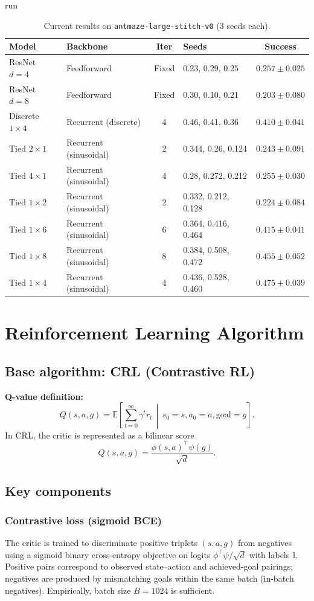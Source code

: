 run\documentclass[11pt]{article}
\begin{document}
\begin{table}[b]
\centering
\small
\begin{tabular}{l l c l c}
\hline
\textbf{Model} & \textbf{Backbone} & \textbf{Iter} & \textbf{Seeds} & \textbf{Success} \\
\hline
ResNet $d=4$ & Feedforward & Fixed & 0.23, 0.29, 0.25 & $0.257 \pm 0.025$ \\
ResNet $d=8$ & Feedforward & Fixed & 0.30, 0.10, 0.21 & $0.203 \pm 0.080$ \\
Discrete $1\times4$ & Recurrent (discrete) & 4 & 0.46, 0.41, 0.36 & $0.410 \pm 0.041$ \\
Tied $2\times1$ & Recurrent (sinusoidal) & 2 & 0.344, 0.26, 0.124 & $0.243 \pm 0.091$ \\
Tied $4\times1$ & Recurrent (sinusoidal) & 4 & 0.28, 0.272, 0.212 & $0.255 \pm 0.030$ \\
Tied $1\times2$ & Recurrent (sinusoidal) & 2 & 0.332, 0.212, 0.128 & $0.224 \pm 0.084$ \\
Tied $1\times6$ & Recurrent (sinusoidal) & 6 & 0.364, 0.416, 0.464 & $0.415 \pm 0.041$ \\
Tied $1\times8$ & Recurrent (sinusoidal) & 8 & 0.384, 0.508, 0.472 & $0.455 \pm 0.052$ \\
Tied $1\times4$ & Recurrent (sinusoidal) & 4 & 0.436, 0.528, 0.460 & $0.475 \pm 0.039$ \\
\hline
\end{tabular}
\caption{Current results on \texttt{antmaze-large-stitch-v0} (3 seeds each).}
\label{tab:antmaze_large_stitch}
\end{table}


\section{Reinforcement Learning Algorithm}
\subsection{Base algorithm: CRL (Contrastive RL)}
\textbf{Q-value definition:}
\[
  Q(s,a,g) = \mathbb{E}\left[\sum_{t=0}^{\infty} \gamma^t r_t\,\middle|\, s_0=s, a_0=a, \text{goal}=g\right].
\]
In CRL, the critic is represented as a bilinear score
\[
  Q(s,a,g) = \frac{\phi(s,a)^\top \psi(g)}{\sqrt{d}}.
\]

\subsection{Key components}
\subsubsection{Contrastive loss (sigmoid BCE)}
The critic is trained to discriminate positive triplets $(s,a,g)$ from negatives using a sigmoid binary cross-entropy objective on logits $\phi^\top\psi/\sqrt{d}$ with labels $\mathbb{I}$. Positive pairs correspond to observed state--action and achieved-goal pairings; negatives are produced by mismatching goals within the same batch (in-batch negatives). Empirically, batch size $B=1024$ is sufficient.
\end{document}
